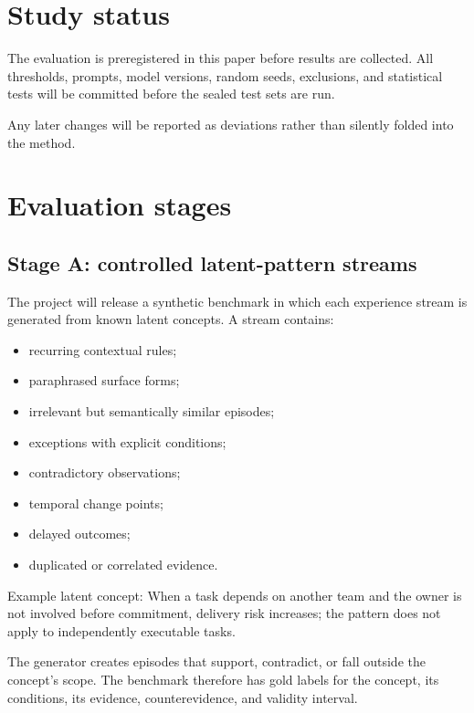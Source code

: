 \documentclass[
  english,
  a4paper,
  DIV=11,
  numbers=noendperiod]{scrreprt}
\providecommand{\tightlist}{%
  \setlength{\itemsep}{0pt}\setlength{\parskip}{0pt}}
\begin{document}
\section{Study status}\label{study-status}

The evaluation is preregistered in this paper before results are
collected. All thresholds, prompts, model versions, random seeds,
exclusions, and statistical tests will be committed before the sealed
test sets are run.

Any later changes will be reported as deviations rather than silently
folded into the method.

\section{Evaluation stages}\label{evaluation-stages}

\subsection{Stage A: controlled latent-pattern
streams}\label{stage-a-controlled-latent-pattern-streams}

The project will release a synthetic benchmark in which each experience
stream is generated from known latent concepts. A stream contains:

\begin{itemize}
\tightlist
\item
  recurring contextual rules;
\item
  paraphrased surface forms;
\item
  irrelevant but semantically similar episodes;
\item
  exceptions with explicit conditions;
\item
  contradictory observations;
\item
  temporal change points;
\item
  delayed outcomes;
\item
  duplicated or correlated evidence.
\end{itemize}

Example latent concept: When a task depends on another team and the
owner is not involved before commitment, delivery risk increases; the
pattern does not apply to independently executable tasks.

The generator creates episodes that support, contradict, or fall outside
the concept's scope. The benchmark therefore has gold labels for the
concept, its conditions, its evidence, counterevidence, and validity
interval.
\end{document}
